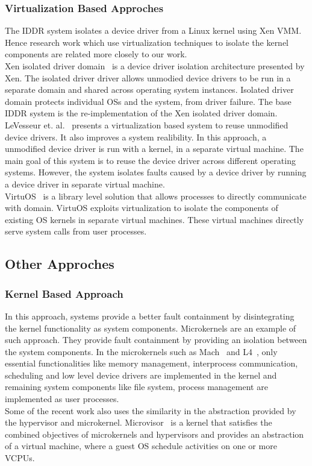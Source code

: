 \subsubsection*{Virtualization Based Approches}
The IDDR system isolates a device driver from a Linux kernel using Xen VMM. Hence research work which use virtualization techniques to isolate the kernel components are related more closely to our work.
\\[3mm]
Xen isolated driver domain~\cite{Fraser04safehardware} is a device driver isolation architecture presented by Xen. The isolated driver driver allows unmodied device drivers to be run in a separate domain and shared across operating system instances. Isolated driver domain protects individual OSs and the system, from driver failure. The base IDDR system is the re-implementation of the Xen isolated driver domain. 
\\[3mm]
LeVesseur et. al.~\cite{LeVasseur04UnmodifiedDriverReuse} presents a virtualization based system to reuse unmodified device drivers. It also improves a system realibility. In this approach, a unmodified device driver is run with a kernel, in a separate virtual machine. The main goal of this system is to reuse the device driver across different operating systems. However, the system isolates faults caused by a device driver by running a device driver in separate virtual machine.
\\[3mm]
VirtuOS~\cite{Nikolaev:2013:VOS:2517349.2522719} is a library level solution that allows processes to directly communicate with domain. VirtuOS exploits
virtualization to isolate the components of existing OS kernels in separate virtual machines. These virtual machines directly serve system calls from
user processes.

\subsection{Other Approches}
\subsubsection*{Kernel Based Approach}
In this approach, systems provide a better fault containment by disintegrating the kernel functionality as system components. Microkernels are an example of such approach. They provide fault containment by providing an isolation between the system components. In the microkernels such as Mach~\cite{Accetta+:usenix86} and L4~\cite{Liedtke+:sosp95}, only essential functionalities like memory management, interprocess communication, scheduling and low level device drivers are implemented in the kernel and remaining system components like file system, process management are implemented as user processes.
\\[3mm]
Some of the recent work also uses the similarity in the abstraction provided by the hypervisor and microkernel. Microvisor~\cite{Heiser+:acm10} is a kernel that satisfies the combined objectives of microkernels and hypervisors and provides an abstraction of a virtual machine, where a guest OS schedule activities on one or more VCPUs.

